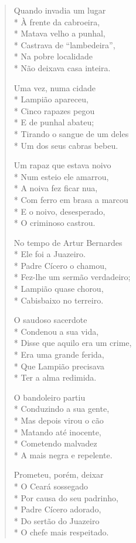 \begin{verse}
Quando invadia um lugar\\*
À frente da cabroeira,\\*
Matava velho a punhal,\\*
Castrava de “lambedeira”, \\*
Na pobre localidade\\*
Não deixava casa inteira.

Uma vez, numa cidade\\*
Lampião apareceu,\\*
Cinco rapazes pegou\\*
E de punhal abateu;\\*
Tirando o sangue de um deles\\*
Um dos seus cabras bebeu.

Um rapaz que estava noivo \\*
Num esteio ele amarrou,\\*
A noiva fez ficar nua,\\*
Com ferro em brasa a marcou\\*
E o noivo, desesperado,\\*
O criminoso castrou.

No tempo de Artur Bernardes\\*
Ele foi a Juazeiro.\\*
Padre Cícero o chamou,\\*
Fez-lhe um sermão verdadeiro;\\*
Lampião quase chorou,\\*
Cabisbaixo no terreiro.

O saudoso sacerdote\\*
Condenou a sua vida,\\*
Disse que aquilo era um crime,\\*
Era uma grande ferida,\\*
Que Lampião precisava\\*
Ter a alma redimida.

O bandoleiro partiu\\*
Conduzindo a sua gente,\\*
Mas depois virou o cão\\*
Matando até inocente,\\*
Cometendo malvadez\\*
A mais negra e repelente.

Prometeu, porém, deixar\\*
O Ceará sossegado\\*
Por causa do seu padrinho,\\*
Padre Cícero adorado,\\*
Do sertão do Juazeiro\\*
O chefe mais respeitado.


\end{verse}
